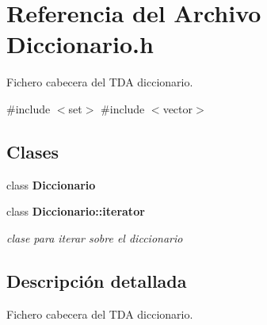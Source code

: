 \section{Referencia del Archivo Diccionario.\+h}
\label{Diccionario_8h}


Fichero cabecera del T\+DA diccionario.  


{\ttfamily \#include $<$set$>$}\newline
{\ttfamily \#include $<$vector$>$}\newline
\subsection*{Clases}
\begin{DoxyCompactItemize}
\item 
class \textbf{ Diccionario}
\item 
class \textbf{ Diccionario\+::iterator}
\begin{DoxyCompactList}\small\item\em clase para iterar sobre el diccionario \end{DoxyCompactList}\end{DoxyCompactItemize}


\subsection{Descripción detallada}
Fichero cabecera del T\+DA diccionario. 

